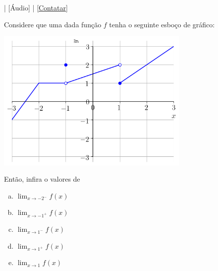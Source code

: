 \begin{flushright}
  [Vídeo] | [Áudio] | \href{https://phkonzen.github.io/notas/contato.html}{[Contatar]}
\end{flushright}

\begin{exeresol}
  Considere que uma dada função $f$ tenha o seguinte esboço de gráfico:

  \begin{center}
    \includegraphics[width=0.7\textwidth]{./cap_lim/dados/fig_exeresol_nocaolim/fig_exeresol_nocaolim}
  \end{center}

  Então, infira o valores de
  \begin{enumerate}[a)]
  \item $\displaystyle \lim_{x\to -2^-} f(x)$
  \item $\displaystyle \lim_{x\to -1^+} f(x)$
  \item $\displaystyle \lim_{x\to 1^-} f(x)$
  \item $\displaystyle \lim_{x\to 1^+} f(x)$
  \item $\displaystyle \lim_{x\to 1} f(x)$
  \end{enumerate}
\end{exeresol}
